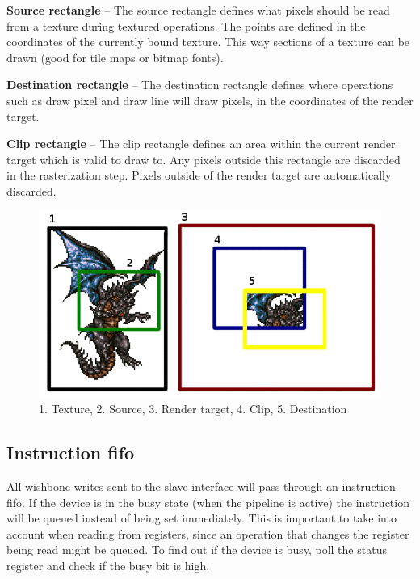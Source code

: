\documentclass[10pt,a4paper]{article}
\begin{document}
\textbf{Source rectangle} -- The source rectangle defines what pixels should be read from a texture during textured operations. The points are defined in the coordinates of the currently bound texture. This way sections of a texture can be drawn (good for tile maps or bitmap fonts).

\textbf{Destination rectangle} -- The destination rectangle defines where operations such as draw pixel and draw line will draw pixels, in the coordinates of the render target.

\textbf{Clip rectangle} -- The clip rectangle defines an area within the current render target which is valid to draw to. Any pixels outside this rectangle are discarded in the rasterization step. Pixels outside of the render target are automatically discarded.

\begin{figure}
\begin{center}
\includegraphics[scale=0.50]{../pictures/SrcClipDest}
\caption{1. Texture, 2. Source, 3. Render target, 4. Clip, 5. Destination}
\label{fig:SrcClipDest}
\end{center}
\end{figure}

\subsection{Instruction fifo}
All wishbone writes sent to the slave interface will pass through an instruction fifo. If the device is in the busy state (when the pipeline is active) the instruction will be queued instead of being set immediately. This is important to take into account when reading from registers, since an operation that changes the register being read might be queued. To find out if the device is busy, poll the status register and check if the busy bit is high.
\end{document}
